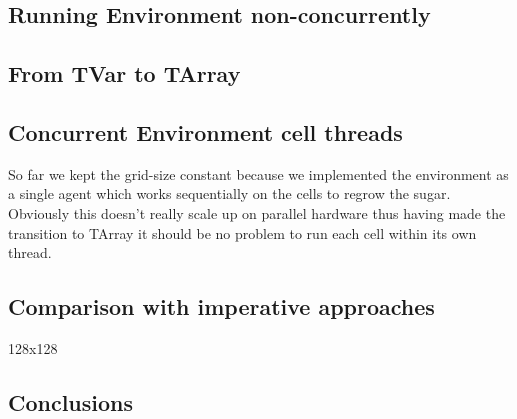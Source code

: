 \subsection{Running Environment non-concurrently}

\subsection{From TVar to TArray}

\subsection{Concurrent Environment cell threads}
So far we kept the grid-size constant because we implemented the environment as a single agent which works sequentially on the cells to regrow the sugar. Obviously this doesn't really scale up on parallel hardware thus having made the transition to TArray it should be no problem to run each cell within its own thread.

\subsection{Comparison with imperative approaches}
128x128

\subsection{Conclusions}